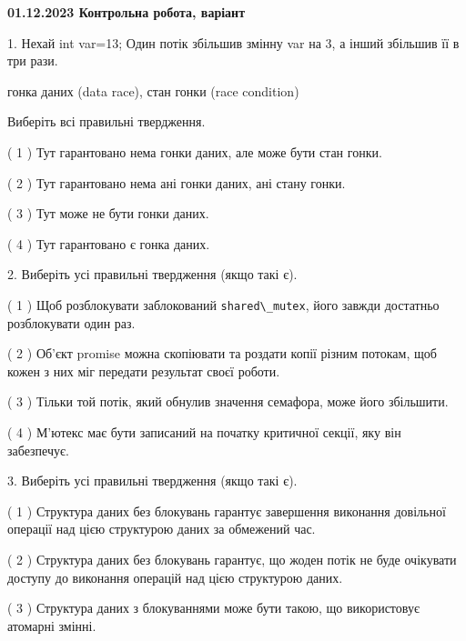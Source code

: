\documentclass[12pt, ukrainian]{article}
\def\code#1{\Verb!#1!}
\begin{document}
\vspace{4mm}
\newpage
\begin {large}

\textbf{01.12.2023 Контрольна робота, варіант  }\par


{
1. Нехай int var=13; Один потік збільшив змінну var на 3, а інший збільшив її в три рази.

гонка даних (data race), стан гонки (race condition)

Виберіть всі правильні твердження.\par
\vspace{2mm}
( 1 ) Тут гарантовано нема гонки даних, але може бути стан гонки.%

( 2 ) Тут гарантовано нема ані гонки даних, ані стану гонки.%

( 3 ) Тут може не бути гонки даних.%

( 4 ) Тут гарантовано є гонка даних.%


\vspace{5mm}
2. Виберіть усі правильні твердження (якщо такі є).\par
\vspace{2mm}

( 1 ) Щоб розблокувати заблокований \code{shared\_mutex}, його завжди достатньо розблокувати один раз.%

( 2 ) Об’єкт promise можна скопіювати та роздати копії різним потокам, щоб кожен з них міг передати результат своєї роботи.%

( 3 ) Тільки той потік, який обнулив значення семафора, може його збільшити.%

( 4 ) М’ютекс має бути записаний на початку критичної секції, яку він забезпечує.%


\vspace{5mm}
3. Виберіть усі правильні твердження (якщо такі є).\par
\vspace{2mm}

( 1 ) Структура даних без блокувань гарантує завершення виконання довільної операції над цією структурою даних за обмежений час.%

( 2 ) Структура даних без блокувань гарантує, що жоден потік не буде очікувати доступу до виконання операцій над цією структурою даних.%

( 3 ) Структура даних з блокуваннями може бути такою, що використовує атомарні змінні.%

}
\end{large}
\end{document}
